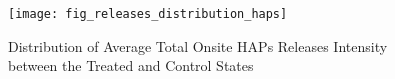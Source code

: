 \begin{figure}[H]
    \centering
    \texttt{[image: fig\_releases\_distribution\_haps]}
    \caption{Distribution of Average Total Onsite HAPs Releases Intensity between the Treated and Control States}
    \label{fig:releases-distribution-haps}
\end{figure}